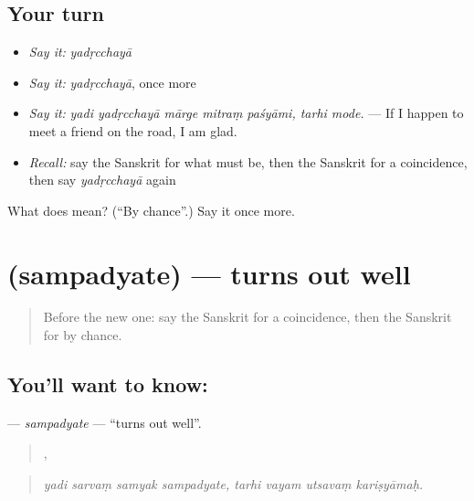 \subsection*{Your turn}
\begin{itemize}
\raggedright
  \item \emph{Say it:} \emph{yadṛcchayā}
  \item \emph{Say it:} \emph{yadṛcchayā}, once more
  \item \emph{Say it:} \emph{yadi yadṛcchayā mārge mitraṃ paśyāmi, tarhi mode.} — If I happen to meet a friend on the road, I am glad.
  \item \emph{Recall:} say the Sanskrit for what must be, then the Sanskrit for a coincidence, then say \emph{yadṛcchayā} again
\end{itemize}

\begin{tcolorbox}[breakable,colback=teal!4,colframe=teal!35!black,title={Before you move on}]
What does  mean? (\textquotedblleft{}By chance\textquotedblright{}.) Say it once more.
\end{tcolorbox}
\section[\texorpdfstring{\sk{सम्पद्यते} (sampadyate)}{सम्पद्यते (sampadyate)}]{ (sampadyate) — turns out well}

\label{lesson:SA-C536-sampadyate}



\begin{quote}
Before the new one: say the Sanskrit for a coincidence, then the Sanskrit for by chance.
\end{quote}

\subsection*{You'll want to know: }
\textbf{} — \emph{sampadyate} — \textquotedblleft{}turns out well\textquotedblright{}.

\begin{quote}
   ,    
\end{quote}

\begin{quote}
\emph{yadi sarvaṃ samyak sampadyate, tarhi vayam utsavaṃ kariṣyāmaḥ.}
\end{quote}

